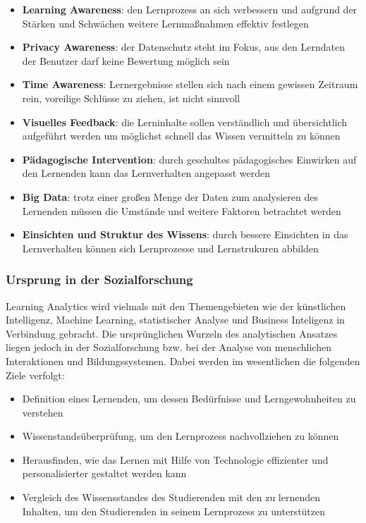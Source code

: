 \begin{itemize}
    \item \textbf{Learning Awareness}: den Lernprozess an sich verbessern und aufgrund der Stärken und Schwächen weitere Lernmaßnahmen effektiv festlegen
    \item \textbf{Privacy Awareness}: der Datenschutz steht im Fokus, aus den Lerndaten der Benutzer darf keine Bewertung möglich sein
    \item \textbf{Time Awareness}: Lernergebnisse stellen sich nach einem gewissen Zeitraum rein, voreilige Schlüsse zu ziehen, ist nicht sinnvoll
    \item \textbf{Visuelles Feedback}: die Lerninhalte sollen verständlich und übersichtlich aufgeführt werden um möglichst schnell das Wissen vermitteln zu können
    \item \textbf{Pädagogische Intervention}: durch geschultes pädagogisches Einwirken auf den Lernenden kann das Lernverhalten angepasst werden
    \item \textbf{Big Data}: trotz einer großen Menge der Daten zum analysieren des Lernenden müssen die Umstände und weitere Faktoren betrachtet werden
    \item \textbf{Einsichten und Struktur des Wissens}: durch bessere Einsichten in das Lernverhalten können sich Lernprozesse und Lernstrukuren abbilden
\end{itemize}


\subsubsection{Ursprung in der Sozialforschung}

Learning Analytics wird vielmals mit den Themengebieten wie der künstlichen Intelligenz, Machine Learning, statistischer Analyse und Business Inteligenz in Verbindung gebracht.
Die ursprünglichen Wurzeln des analytischen Ansatzes liegen jedoch in der Sozialforschung bzw. bei der Analyse von menschlichen Interaktionen und Bildungssystemen.\autocite[Vgl.][S. 1383]{ej-GeorgeSiemens}
Dabei werden im wesentlichen die folgenden Ziele verfolgt:\autocite[Vgl.][ab Minute 11]{ej-GeorgSiemensVideo}

\begin{itemize}
    \item Definition eines Lernenden, um dessen Bedürfnisse und Lerngewohnheiten zu verstehen
    \item Wissenstandsüberprüfung, um den Lernprozess nachvollziehen zu können
    \item Herausfinden, wie das Lernen mit Hilfe von Technologie effizienter und personalisierter gestaltet werden kann
    \item Vergleich des Wissensstandes des Studierenden mit den zu lernenden Inhalten, um den Studierenden in seinem Lernprozess zu unterstützen
\end{itemize}

